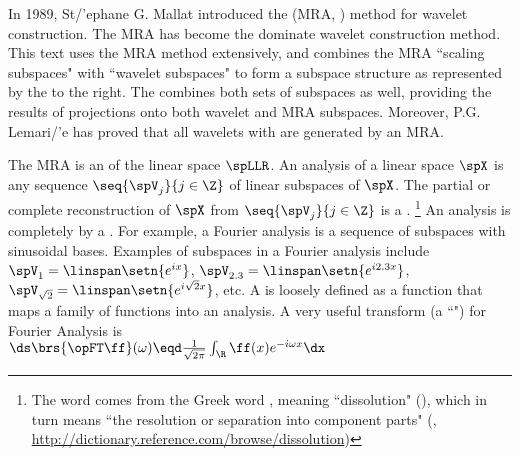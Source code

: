 \begin{minipage}{\tw-65mm}
  In 1989, St{/'e}phane G. Mallat introduced the  (MRA, )
  method for wavelet construction. The MRA has become the dominate wavelet construction method.
  This text uses the MRA method extensively, 
  and combines the MRA ``scaling subspaces"  with ``wavelet subspaces"  
  to form a subspace structure as represented by the 
   to the right.
  The  combines both sets of subspaces as well, 
  providing the results of projections onto both wavelet and MRA subspaces.
  Moreover, P.G. Lemari{/'e} has proved that all wavelets with  are generated by an MRA.\footnotemark
\end{minipage}\hfill%

The MRA is an  of the linear space $\spLLR$.
An analysis of a linear space $\spX$ is any sequence $\seq{\spV_j}{j\in\Z}$ of linear subspaces of $\spX$.
        The partial or complete reconstruction of $\spX$ from $\seq{\spV_j}{j\in\Z}$ is a .%
        \footnote{%
          The word  comes from the Greek word
          {},
          meaning ``dissolution" (),
          which in turn means
          ``the resolution or separation into component parts"
          (, \scs\url{http://dictionary.reference.com/browse/dissolution})
          }
  An analysis is completely  by a .
  For example, a Fourier analysis is a sequence of subspaces with sinusoidal bases.
  Examples of subspaces in a Fourier analysis include $\spV_1=\linspan\setn{e^{ix}}$, 
  $\spV_{2.3}=\linspan\setn{e^{i2.3x}}$, $\spV_{\sqrt{2}}=\linspan\setn{e^{i\sqrt{2}x}}$, etc.
  A  is loosely defined as a function that maps a family of functions
  into an analysis.
  A very useful transform (a ``") for Fourier Analysis is 
  \\\indentx$\ds\brs{\opFT\ff}(\omega) \eqd \frac{1}{\sqrt{2\pi}} \int_\R \ff(x) e^{-i\omega x} \dx$


